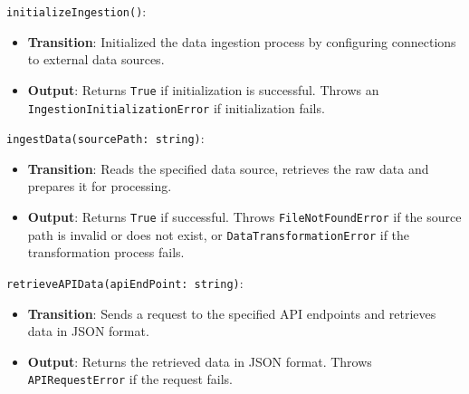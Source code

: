 \documentclass[12pt, titlepage]{article}
\begin{document}
\begin{description}
\begin{description}
\begin{description}
  \item[Access Routine Semantics:] 
  \item
  \texttt{initializeIngestion()}:
  \item
  \begin{itemize}
    \item \textbf{Transition}: Initialized the data ingestion process by configuring connections to
    external data sources.
  \end{itemize}
  \item
  \begin{itemize}
    \item \textbf{Output}: Returns \texttt{True} if initialization is successful. Throws an
    \\ \texttt{IngestionInitializationError} if initialization fails.
  \end{itemize}
  \item 

  \texttt{ingestData(sourcePath: string)}:
  \item
  \begin{itemize}
    \item \textbf{Transition}: Reads the specified data source, retrieves the raw data and prepares
    it for processing.
  \end{itemize}
  \item
  \begin{itemize}
    \item \textbf{Output}: Returns \texttt{True} if successful. Throws \texttt{FileNotFoundError}
    if the source path is invalid or does not exist, or \texttt{DataTransformationError} if the
    transformation process fails.
  \end{itemize}
  \item

  \texttt{retrieveAPIData(apiEndPoint: string)}:
  \item
  \begin{itemize}
    \item \textbf{Transition}: Sends a request to the specified API endpoints and retrieves data in JSON
    format.
  \end{itemize}
  \item 
  \begin{itemize}
    \item \textbf{Output}: Returns the retrieved data in JSON format. Throws \texttt{APIRequestError} if
    the request fails.
  \end{itemize}
  \item


\end{description}
\end{description}
\end{description}
\end{document}
